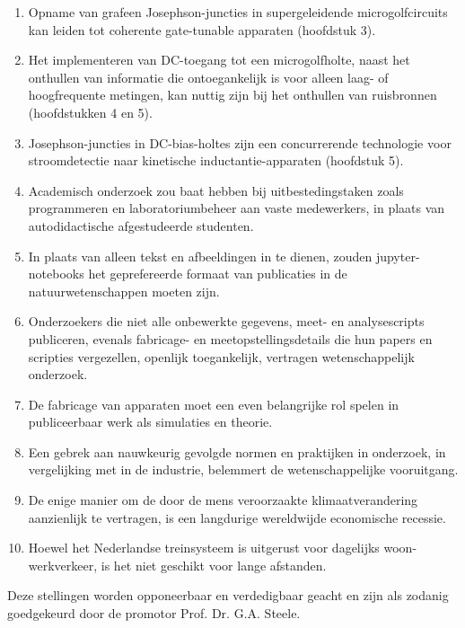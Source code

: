 \documentclass{dissertation-edit}
\begin{document}
{\begin{enumerate}
\item Opname van grafeen Josephson-juncties in supergeleidende microgolfcircuits kan leiden tot coherente gate-tunable apparaten (hoofdstuk 3).
%
\item Het implementeren van DC-toegang tot een microgolfholte, naast het onthullen van informatie die ontoegankelijk is voor alleen laag- of hoogfrequente metingen, kan nuttig zijn bij het onthullen van ruisbronnen (hoofdstukken 4 en 5).
%
\item Josephson-juncties in DC-bias-holtes zijn een concurrerende technologie voor stroomdetectie naar kinetische inductantie-apparaten (hoofdstuk 5).
%
\item Academisch onderzoek zou baat hebben bij uitbestedingstaken zoals programmeren en laboratoriumbeheer aan vaste medewerkers, in plaats van autodidactische afgestudeerde studenten.
%
\item In plaats van alleen tekst en afbeeldingen in te dienen, zouden jupyter-notebooks het geprefereerde formaat van publicaties in de natuurwetenschappen moeten zijn.
\item Onderzoekers die niet alle onbewerkte gegevens, meet- en analysescripts publiceren, evenals fabricage- en meetopstellingsdetails die hun papers en scripties vergezellen, openlijk toegankelijk, vertragen wetenschappelijk onderzoek.
%
\item De fabricage van apparaten moet een even belangrijke rol spelen in publiceerbaar werk als simulaties en theorie.
%
\item Een gebrek aan nauwkeurig gevolgde normen en praktijken in onderzoek, in vergelijking met in de industrie, belemmert de wetenschappelijke vooruitgang.
%
\item De enige manier om de door de mens veroorzaakte klimaatverandering aanzienlijk te vertragen, is een langdurige wereldwijde economische recessie.
%
\item Hoewel het Nederlandse treinsysteem is uitgerust voor dagelijks woon-werkverkeer, is het niet geschikt voor lange afstanden.

\end{enumerate}

\bigskip
\bigskip

\begin{center}
Deze stellingen worden opponeerbaar en verdedigbaar geacht en zijn als zodanig goedgekeurd door de promotor Prof. Dr. G.A. Steele.
\end{center}

}
\end{document}
